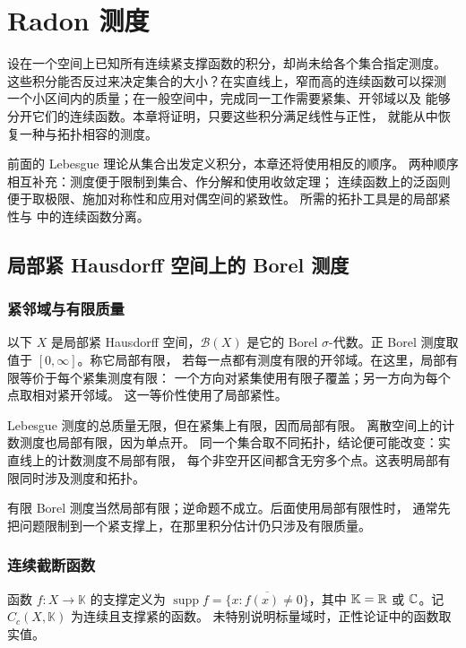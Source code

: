 \chapter{Radon 测度}
\label{chap:radon-measures}

设在一个空间上已知所有连续紧支撑函数的积分，却尚未给各个集合指定测度。
这些积分能否反过来决定集合的大小？在实直线上，窄而高的连续函数可以探测
一个小区间内的质量；在一般空间中，完成同一工作需要紧集、开邻域以及
能够分开它们的连续函数。本章将证明，只要这些积分满足线性与正性，
就能从中恢复一种与拓扑相容的测度。

前面的 Lebesgue 理论从集合出发定义积分，本章还将使用相反的顺序。
两种顺序相互补充：测度便于限制到集合、作分解和使用收敛定理；
连续函数上的泛函则便于取极限、施加对称性和应用对偶空间的紧致性。
所需的拓扑工具是的局部紧性与
中的连续函数分离。

\section{局部紧 Hausdorff 空间上的 Borel 测度}
\label{sec:lch-borel-measures}

\subsection{紧邻域与有限质量}

以下 \(X\) 是局部紧 Hausdorff 空间，\(\mathcal B(X)\) 是它的 Borel
\(\sigma\)-代数。正 Borel 测度取值于 \([0,\infty]\)。称它局部有限，
若每一点都有测度有限的开邻域。在这里，局部有限等价于每个紧集测度有限：
一个方向对紧集使用有限子覆盖；另一方向为每个点取相对紧开邻域。
这一等价性使用了局部紧性。

Lebesgue 测度的总质量无限，但在紧集上有限，因而局部有限。
离散空间上的计数测度也局部有限，因为单点开。
同一个集合取不同拓扑，结论便可能改变：实直线上的计数测度不局部有限，
每个非空开区间都含无穷多个点。这表明局部有限同时涉及测度和拓扑。

有限 Borel 测度当然局部有限；逆命题不成立。后面使用局部有限性时，
通常先把问题限制到一个紧支撑上，在那里积分估计仍只涉及有限质量。

\subsection{连续截断函数}

函数 \(f:X\to\mathbb K\) 的支撑定义为
\(\operatorname{supp}f=\overline{\{x:f(x)\ne0\}}\)，其中
\(\mathbb K=\mathbb{R}\) 或 \(\mathbb{C}\)。记 \(C_c(X,\mathbb K)\) 为连续且支撑紧的函数。
未特别说明标量域时，正性论证中的函数取实值。

